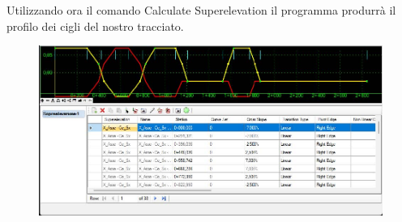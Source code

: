 Utilizzando ora il comando Calculate Superelevation il programma produrrà il profilo dei cigli del nostro tracciato.

\begin{figure}[H]
	\centering
	\includegraphics[width=\linewidth]{Figures/Profilo dei cigli}
    \label{fig:Profilo dei cigli}
\end{figure}